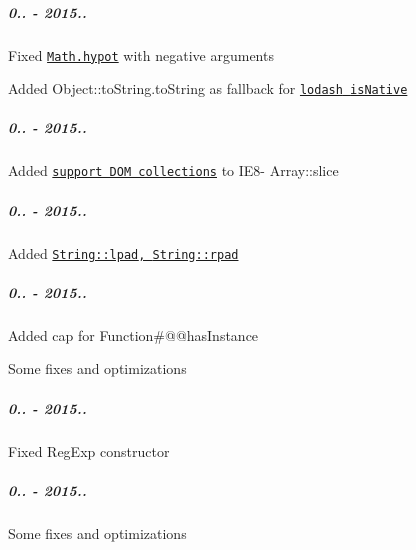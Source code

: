 \subparagraph*{0.. -\/ 2015..}


\begin{DoxyItemize}
\item Fixed \href{https://github.com/zloirock/core-js/#ecmascript-6-math}{\tt {\ttfamily Math.\+hypot}} with negative arguments
\item Added {\ttfamily Object\+::to\+String.\+to\+String} as fallback for \href{https://github.com/lodash/lodash/issues/1197}{\tt {\ttfamily lodash} {\ttfamily is\+Native}}
\end{DoxyItemize}

\subparagraph*{0.. -\/ 2015..}


\begin{DoxyItemize}
\item Added \href{https://developer.mozilla.org/en-US/docs/Web/JavaScript/Reference/Global_Objects/Array/slice#Streamlining_cross-browser_behavior}{\tt support D\+OM collections} to I\+E8-\/ {\ttfamily Array\+::slice}
\end{DoxyItemize}

\subparagraph*{0.. -\/ 2015..}


\begin{DoxyItemize}
\item Added \href{https://github.com/zloirock/core-js/#ecmascript-7-proposals}{\tt {\ttfamily String\+::lpad}, {\ttfamily String\+::rpad}}
\end{DoxyItemize}

\subparagraph*{0.. -\/ 2015..}


\begin{DoxyItemize}
\item Added cap for {\ttfamily Function\#@@has\+Instance}
\item Some fixes and optimizations
\end{DoxyItemize}

\subparagraph*{0.. -\/ 2015..}


\begin{DoxyItemize}
\item Fixed {\ttfamily Reg\+Exp} constructor
\end{DoxyItemize}

\subparagraph*{0.. -\/ 2015..}


\begin{DoxyItemize}
\item Some fixes and optimizations
\end{DoxyItemize}

